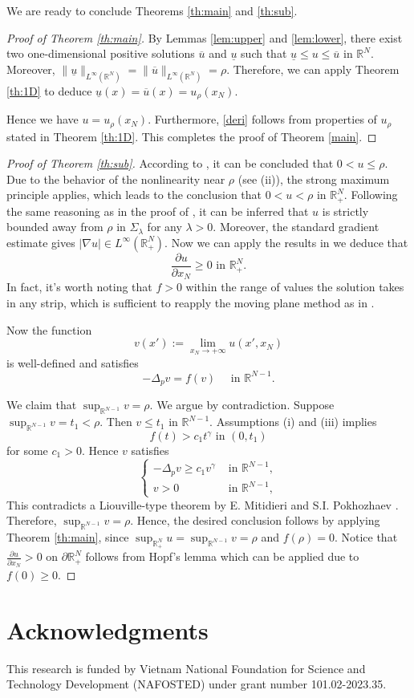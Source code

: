 \documentclass[reqno]{amsart}
\theoremstyle{plain}
\theoremstyle{definition}
\theoremstyle{remark}
\begin{document}
	We are ready to conclude Theorems \ref{th:main} and \ref{th:sub}.
	\begin{proof}[Proof of Theorem \ref{th:main}]
		By Lemmas \ref{lem:upper} and \ref{lem:lower}, there exist two one-dimensional positive solutions $\overline u$ and $\underline u$ such that $\underline u \le u \le \overline u$ in $\mathbb{R}^N$. Moreover, $\|\underline u\|_{L^\infty(\mathbb{R}^N)}=\|\overline u\|_{L^\infty(\mathbb{R}^N)}=\rho$. Therefore, we can apply Theorem \ref{th:1D} to deduce $\underline u(x) = \overline u(x) = u_\rho(x_N)$.
		
		Hence we have $u = u_\rho(x_N)$. Furthermore, \eqref{deri} follows from properties of $u_\rho$ stated in Theorem \ref{th:1D}. This completes the proof of Theorem \ref{main}.
	\end{proof}
	
	\begin{proof}[Proof of Theorem \ref{th:sub}]
		According to \cite[Theorem 1.7]{MR2886112}, it can be concluded that $0 < u \le \rho$.		
		Due to the behavior of the nonlinearity near \( \rho \) (see (ii)), the strong maximum principle applies, which leads to the conclusion that \( 0 < u < \rho \) in $\mathbb{R}^N_+$. Following the same reasoning as in the proof of \cite[Theorem 1.3]{MR3303939}, it can be inferred that \( u \) is strictly bounded away from \( \rho \) in \( \Sigma_\lambda \) for any \( \lambda > 0 \). Moreover, the standard gradient estimate gives $|\nabla u|\in L^\infty(\mathbb{R}^N_+)$. Now we can apply the results in \cite{MR3303939,MR3752525} we deduce that
		\[
		\frac{\partial u}{\partial x_N} \ge 0 \text{ in } \mathbb{R}^N_+.
		\]
		In fact, it's worth noting that $f>0$ within the range of values the solution takes in any strip, which is sufficient to reapply the moving plane method as in \cite{MR3303939,MR3752525}.
		
		Now the function
		\[
		v(x'):=\lim_{x_N\to+\infty} u(x',x_N)
		\]
		is well-defined and satisfies
		\[
		-\Delta_p v = f(v) \quad\text{ in } \mathbb{R}^{N-1}.
		\]
		
		We claim that $\sup_{\mathbb{R}^{N-1}} v = \rho$. We argue by contradiction. Suppose $\sup_{\mathbb{R}^{N-1}} v = t_1 < \rho$. Then $v\le t_1$ in $\mathbb{R}^{N-1}$. Assumptions (i) and (iii) implies
		\[
		f(t) > c_1 t^\gamma \text{ in } (0, t_1)
		\]
		for some $c_1>0$.
		Hence $v$ satisfies
		\[
		\begin{cases}
			-\Delta_p v \ge c_1 v^\gamma &\text{ in } \mathbb{R}^{N-1},\\
			v > 0 &\text{ in } \mathbb{R}^{N-1},
		\end{cases}
		\]
		This contradicts a Liouville-type theorem by E. Mitidieri and S.I. Pokhozhaev \cite{MR1784317}. Therefore, \(\sup_{\mathbb{R}^{N-1}} v = \rho\). Hence, the desired conclusion follows by applying Theorem \eqref{th:main}, since \(\sup_{\mathbb{R}^N_+} u = \sup_{\mathbb{R}^{N-1}} v = \rho\) and \(f(\rho) = 0\). Notice that $\frac{\partial u}{\partial x_N} > 0$ on $\partial{\mathbb{R}^N_+}$ follows from Hopf's lemma which can be applied due to $f(0)\ge0$.
	\end{proof}
	
	\section*{Acknowledgments}
	This research is funded by Vietnam National Foundation for Science and Technology Development (NAFOSTED) under grant number 101.02-2023.35.
	
	
	
	
\end{document}
